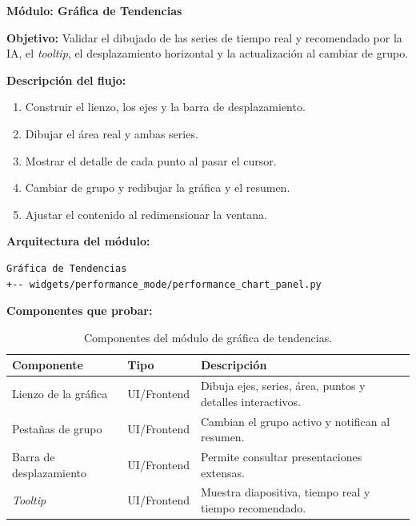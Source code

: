 \documentclass[12pt,letterpaper]{article}
\begin{document}
\clearpage
\textbf{Módulo: Gráfica de Tendencias}

\textbf{Objetivo:} Validar el dibujado de las series de tiempo real y recomendado por la IA, el \textit{tooltip}, el desplazamiento horizontal y la actualización al cambiar de grupo.

\textbf{Descripción del flujo:}
\begin{enumerate}
\item Construir el lienzo, los ejes y la barra de desplazamiento.
\item Dibujar el área real y ambas series.
\item Mostrar el detalle de cada punto al pasar el cursor.
\item Cambiar de grupo y redibujar la gráfica y el resumen.
\item Ajustar el contenido al redimensionar la ventana.
\end{enumerate}

\textbf{Arquitectura del módulo:}
\begin{verbatim}
Gráfica de Tendencias
+-- widgets/performance_mode/performance_chart_panel.py
\end{verbatim}

\textbf{Componentes que probar:}
\begin{table}[H]
\centering
\begin{tabular}{|L{0.34\textwidth}|L{0.18\textwidth}|L{0.38\textwidth}|}
\hline
\textbf{Componente} & \textbf{Tipo} & \textbf{Descripción} \\ \hline
Lienzo de la gráfica & UI/Frontend & Dibuja ejes, series, área, puntos y detalles interactivos. \\ \hline
Pestañas de grupo & UI/Frontend & Cambian el grupo activo y notifican al resumen. \\ \hline
Barra de desplazamiento & UI/Frontend & Permite consultar presentaciones extensas. \\ \hline
\textit{Tooltip} & UI/Frontend & Muestra diapositiva, tiempo real y tiempo recomendado. \\ \hline
\end{tabular}
\caption{Componentes del módulo de gráfica de tendencias.}
\label{tab:componentes-modulo-grafica}
\end{table}
\end{document}
